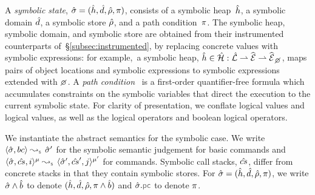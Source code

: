 A \emph{symbolic state}, $\hat{\sigma} = (\hat{h}, \hat{d}, \hat\rho, \pi)$, consists of a 
symbolic heap~$\hat{h}$, a symbolic domain $\hat{d}$, a symbolic store $\hat\rho$, and a path condition~$\pi$. 
The symbolic heap, symbolic domain, and symbolic store are obtained from their instrumented 
counterparts of~\S\ref{subsec:instrumented}, by replacing concrete values with symbolic expressions: for example,~a symbolic heap, $\sheap \in \sheaps : \slocs \partialmap \sexprs \partialmap \setext{\sexprs}{\none}$,
 maps pairs of object locations and symbolic expressions to symbolic expressions
extended with $\none$. 
A \emph{path condition}~\cite{symb:exec:survey} is a first-order quantifier-free formula which
 accumulates constraints on the symbolic variables that direct 
the execution to the current symbolic state.
For clarity of presentation, we conflate \jsil logical values and logical values, as well as the \jsil logical operators and boolean logical operators.

We instantiate the abstract semantics for the symbolic case.  
We write $\absbsemrule{\sstate, \bcmd}{\sstate'}{\symbolic}$ for the symbolic semantic 
judgement for basic commands and $\abssemrule{\sstate, \scs, i}{\sstate', \scs', j}{\mode}{\mode'}{\symbolic}$ 
for commands. Symbolic call stacks, $\hat{cs}$, differ from concrete stacks in that they contain symbolic stores.
For $\hat{\sigma} = (\hat{h}, \hat{d}, \hat\rho, \pi)$, we write $\hat{\sigma} \wedge \hat{b}$ to denote $(\hat{h}, \hat{d}, \hat\rho, \pi \wedge \hat{b})$ and $\sstate.\pcsel\!$ to denote $\pi$.



